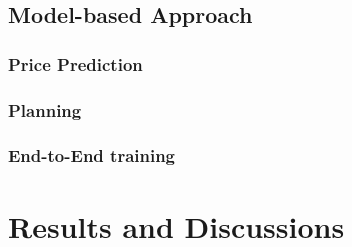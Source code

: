 \documentclass[a4paper, 10pt]{article}
\begin{document}
\begin{spacing}{1.2}
    
    \subsection{Model-based Approach}
    \subsubsection{Price Prediction}
    
    \subsubsection{Planning}
    
    \subsubsection{End-to-End training}
    
    \section{Results and Discussions}
    
%    
    
    
  
  \end{spacing}  
  
  
\end{document}
